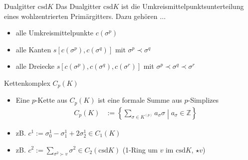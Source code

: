 \documentclass{beamer}
\newcommand{\Z}{\mathds{Z}}
\newcommand{\csd}{\text{csd}}
\begin{document}
  \begin{frame}
    \begin{block}{Dualgitter \( \csd K \)}
      Das Dualgitter \( \csd K \) ist die Umkreismittelpunktsunterteilung eines wohlzentrierten Primärgitters.
      Dazu gehören \( \ldots \) 
      \begin{itemize}
        \item<2-> alle Umkreismittelpunkte \( c(\sigma^{p}) \)
        \item<3-> alle Kanten \( s[c(\sigma^{p}), c(\sigma^{q})] \) mit \( \sigma^{p}\prec\sigma^{q} \)
        \item<4-> alle Dreiecke \( s[c(\sigma^{p}), c(\sigma^{q}),  c(\sigma^{r})] \) mit \( \sigma^{p}\prec\sigma^{q}\prec\sigma^{r} \)
      \end{itemize}
    \end{block}
      \begin{overprint}
         \centering
         \centering
         \centering
         \centering
         \centering
      \end{overprint}
  \end{frame}

  \begin{frame}
  \small
    \begin{block}{Kettenkomplex \( C_{p}(K) \)}
      \begin{itemize}
        \setlength{\itemsep}{1pt}
        \item<1->  Eine \( p \)-Kette aus \( C_{p}(K) \) ist eine formale Summe aus \( p \)-Simplizes
            \begin{align*}
              C_{p}(K) &:= \left\{\sum_{\sigma\in K^{(p)}}a_{\sigma}\sigma \middle| a_{\sigma}\in\Z \right\}
            \end{align*}
        \item<2-> zB. \( c^{1} := \sigma^{1}_{0} - \sigma^{1}_{1} + 2\sigma^{1}_{2}\in C_{1}(K) \)
        \item<3-> zB. \( c^{2} := \sum_{\sigma^{2}\succ v} \sigma^{2} \in C_{2}(\csd K) \) (1-Ring um \( v \) im \( \csd K \), \( \star v \))
      \end{itemize}
    \end{block}
      \begin{overprint}
         \centering
         \centering
      \end{overprint}
  \end{frame}
\end{document}
